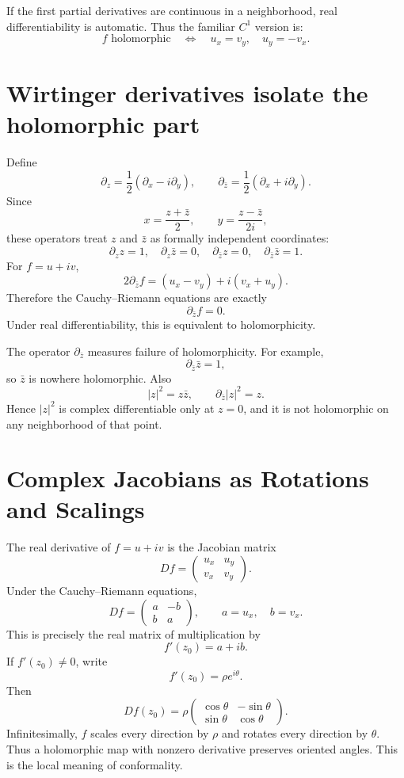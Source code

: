 If the first partial derivatives are continuous in a neighborhood, real differentiability is automatic.  Thus the familiar \(C^1\) version is:
\[
  f\text{ holomorphic}
  \quad\Longleftrightarrow\quad
  u_x=v_y,
  \quad
  u_y=-v_x.
\]

\section{Wirtinger derivatives isolate the holomorphic part}

Define
\[
  \partial_z
  =\frac12\left(\partial_x-i\partial_y\right),
  \qquad
  \partial_{\bar z}
  =\frac12\left(\partial_x+i\partial_y\right).
\]
Since
\[
  x=\frac{z+\bar z}{2},
  \qquad
  y=\frac{z-\bar z}{2i},
\]
these operators treat \(z\) and \(\bar z\) as formally independent coordinates:
\[
  \partial_z z=1,
  \quad
  \partial_z\bar z=0,
  \quad
  \partial_{\bar z}z=0,
  \quad
  \partial_{\bar z}\bar z=1.
\]
For \(f=u+iv\),
\[
  2\partial_{\bar z}f
  =(u_x-v_y)+i(v_x+u_y).
\]
Therefore the Cauchy--Riemann equations are exactly
\[
  \boxed{\partial_{\bar z}f=0.}
\]
Under real differentiability, this is equivalent to holomorphicity.

The operator \(\partial_{\bar z}\) measures failure of holomorphicity.  For example,
\[
  \partial_{\bar z}\bar z=1,
\]
so \(\bar z\) is nowhere holomorphic.  Also
\[
  |z|^2=z\bar z,
  \qquad
  \partial_{\bar z}|z|^2=z.
\]
Hence \(|z|^2\) is complex differentiable only at \(z=0\), and it is not holomorphic on any neighborhood of that point.

\section{Complex Jacobians as Rotations and Scalings}

The real derivative of \(f=u+iv\) is the Jacobian matrix
\[
  Df=
  \begin{pmatrix}
  u_x&u_y\\
  v_x&v_y
  \end{pmatrix}.
\]
Under the Cauchy--Riemann equations,
\[
  Df=
  \begin{pmatrix}
  a&-b\\
  b&a
  \end{pmatrix},
  \qquad
  a=u_x,
  \quad
  b=v_x.
\]
This is precisely the real matrix of multiplication by
\[
  f'(z_0)=a+ib.
\]
If \(f'(z_0)\ne0\), write
\[
  f'(z_0)=\rho e^{i\theta}.
\]
Then
\[
  Df(z_0)=
  \rho
  \begin{pmatrix}
  \cos\theta&-\sin\theta\\
  \sin\theta&\cos\theta
  \end{pmatrix}.
\]
Infinitesimally, \(f\) scales every direction by \(\rho\) and rotates every direction by \(\theta\).  Thus a holomorphic map with nonzero derivative preserves oriented angles.  This is the local meaning of conformality.

